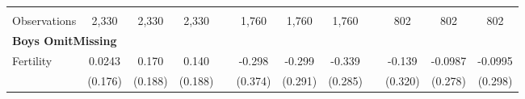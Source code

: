 \begin{landscape}
\begin{table}[htpb!]
\begin{center}
\begin{tabular}{lcccp{2mm}cccp{2mm}ccc}
\begin{footnotesize}\end{footnotesize}&\begin{footnotesize}\end{footnotesize}&\begin{footnotesize}\end{footnotesize}&\begin{footnotesize}\end{footnotesize}&\begin{footnotesize}\end{footnotesize}&\begin{footnotesize}\end{footnotesize}&\begin{footnotesize}\end{footnotesize}&\begin{footnotesize}\end{footnotesize}&\begin{footnotesize}\end{footnotesize}&\begin{footnotesize}\end{footnotesize}&\begin{footnotesize}\end{footnotesize}&\begin{footnotesize}\end{footnotesize}\\Observations&2,330&2,330&2,330&&1,760&1,760&1,760&&802&802&802\\
\multicolumn{12}{l}{\textbf{Boys OmitMissing}}\\ 
Fertility&0.0243&0.170&0.140&&-0.298&-0.299&-0.339&&-0.139&-0.0987&-0.0995\\
&(0.176)&(0.188)&(0.188)&&(0.374)&(0.291)&(0.285)&&(0.320)&(0.278)&(0.298)\\

\end{tabular}
\end{center}
\end{table}
\end{landscape}

